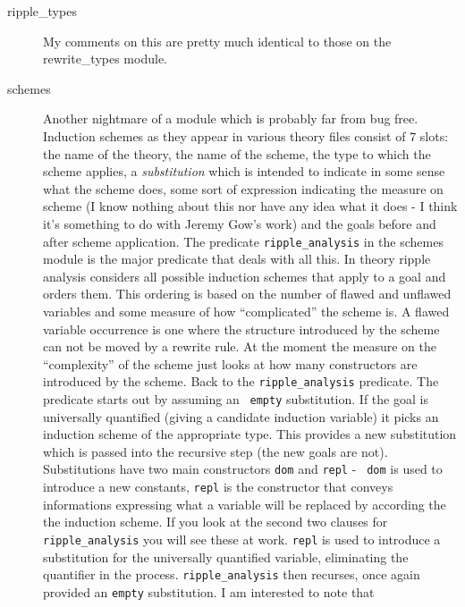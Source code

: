 \begin{description}
\item[ripple\_types]  My comments on this
  are pretty much identical to those on the rewrite\_types
  module.
\item[schemes] Another nightmare of a module
  which is probably far from bug free.  Induction
  schemes as they appear in various theory
  files consist of 7 slots: the name of the theory, the name of the
  scheme, the type to which the scheme applies, a {\em
    substitution} which is intended to indicate in
  some sense what the scheme does, some sort of expression indicating
  the measure on scheme (I know nothing about this nor have any idea
  what it does - I think it's something to do with Jeremy Gow's work)
  and the goals before and after scheme application.  The predicate
  {\tt ripple\_analysis} in the schemes module
  is the major predicate that deals with all this.  In theory ripple
  analysis considers all possible induction schemes that apply to a
  goal and orders them.  This ordering is based on the number of
  flawed and unflawed variables and some measure of how ``complicated'' the
  scheme is.  A flawed variable
  occurrence is one where the structure introduced by the scheme can
  not be moved by a rewrite rule.  At the moment the measure on the
  ``complexity'' of the scheme just looks at how many constructors are
  introduced by the scheme.  Back to the {\tt ripple\_analysis}
  predicate.  The predicate starts out by assuming an {\tt
    empty} substitution.  If the goal is universally
  quantified (giving a candidate induction variable) it picks an induction scheme of the appropriate type.
  This provides a new substitution which is passed into the recursive
  step (the new goals are not).  Substitutions have two main
  constructors {\tt dom} and {\tt repl} - {\tt
    dom} is used to introduce a new constants, {\tt repl} is the
  constructor that conveys informations expressing what a variable
  will be replaced by according the the induction scheme.  If you look
  at the second two clauses for {\tt ripple\_analysis} you will see
  these at work.  {\tt repl} is used to introduce a substitution for
  the universally quantified variable, eliminating the quantifier in
  the process.  {\tt ripple\_analysis} then recurses, once again
  provided an {\tt empty} substitution.  I am interested to note that

\end{description}
